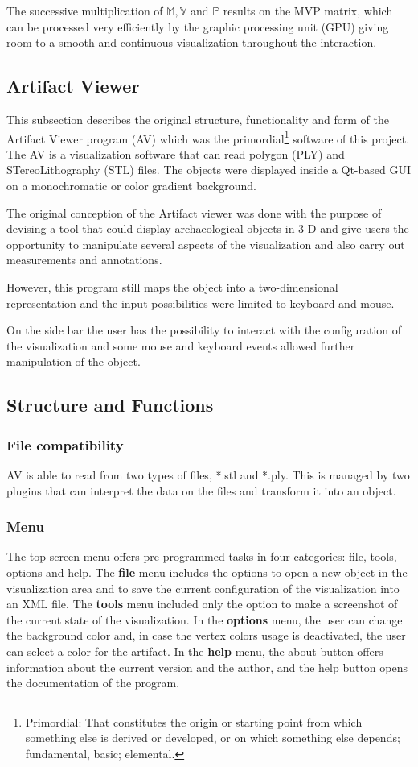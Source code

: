 \documentclass[12pt]{extarticle}
\newcommand{\Mod}{\mathbb{M}}
\newcommand{\Pro}{\mathbb{P}}
\newcommand{\Vie}{\mathbb{V}}
\begin{document}
The successive multiplication of $\Mod, \Vie$ and $\Pro$ results on the MVP matrix, which can be processed very efficiently by the graphic processing unit (GPU) giving room to a smooth and continuous visualization throughout the interaction.

\subsection{Artifact Viewer}
This subsection describes the original structure, functionality and form of the Artifact Viewer program (AV) which was the primordial\footnote{Primordial: That constitutes the origin or starting point from which something else is derived or developed, or on which something else depends; fundamental, basic; elemental.\cite{OED}} software of this project\cite{AV}. The AV is a visualization software that can read polygon (PLY) and STereoLithography (STL) files. The objects were displayed inside a Qt-based GUI on a monochromatic or color gradient background.

The original conception of the Artifact viewer was done with the purpose of devising a tool that could display archaeological objects in 3-D and give users the opportunity to manipulate several aspects of the visualization and also carry out measurements and annotations.

However, this program still maps the object into a two-dimensional representation and the input possibilities were limited to keyboard and mouse.

On the side bar the user has the possibility to interact with the configuration of the visualization and some mouse and keyboard events allowed further manipulation of the object.
\subsection {Structure and Functions}
	\subsubsection { File compatibility}
	AV is able to read from two types of files, *.stl and *.ply. This is managed by two plugins that can interpret the data on the files and transform it into an object.
	\subsubsection { Menu}
	The top screen menu offers pre-programmed tasks in four categories: file, tools, options and help.
	The \textbf{file} menu includes the options to open a new object in the visualization area and to save the current configuration of the visualization into an XML file.
	The \textbf{tools} menu included only the option to make a screenshot of the current state of the visualization.
	In the \textbf{options} menu, the user can change the background color and, in case the vertex colors usage is deactivated, the user can select a color for the artifact.
	In the \textbf{help} menu, the about button offers information about the current version and the author, and the help button opens the documentation of the program.
\end{document}
